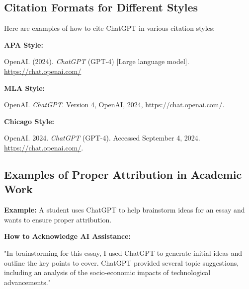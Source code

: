 \documentclass{article}
\begin{document}
\subsection{Citation Formats for Different Styles}

Here are examples of how to cite ChatGPT in various citation styles:

\textbf{APA Style:}

\begin{mdframed}
\begin{flushleft}
OpenAI. (2024). \textit{ChatGPT} (GPT-4) [Large language model]. \url{https://chat.openai.com/}
\end{flushleft}
\end{mdframed}

\textbf{MLA Style:}

\begin{mdframed}
\begin{flushleft}
OpenAI. \textit{ChatGPT}. Version 4, OpenAI, 2024, \url{https://chat.openai.com/}.
\end{flushleft}
\end{mdframed}

\textbf{Chicago Style:}

\begin{mdframed}
\begin{flushleft}
OpenAI. 2024. \textit{ChatGPT} (GPT-4). Accessed September 4, 2024. \url{https://chat.openai.com/}.
\end{flushleft}
\end{mdframed}

\subsection{Examples of Proper Attribution in Academic Work}

\textbf{Example:} A student uses ChatGPT to help brainstorm ideas for an essay and wants to ensure proper attribution.

\textbf{How to Acknowledge AI Assistance:}

\begin{mdframed}
\begin{flushleft}
"In brainstorming for this essay, I used ChatGPT to generate initial ideas and outline the key points to cover. ChatGPT provided several topic suggestions, including an analysis of the socio-economic impacts of technological advancements."
\end{flushleft}
\end{mdframed}
\end{document}
